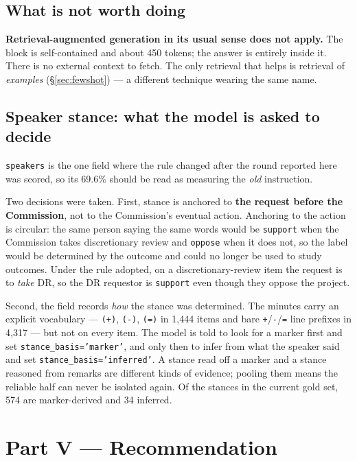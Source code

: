 \documentclass[11pt]{article}
\begin{document}
\subsection{What is not worth doing}

\textbf{Retrieval-augmented generation in its usual sense does not apply.} The block is
self-contained and about 450 tokens; the answer is entirely inside it. There is no external
context to fetch. The only retrieval that helps is retrieval of \emph{examples}
(\S\ref{sec:fewshot}) --- a different technique wearing the same name.

\subsection{Speaker stance: what the model is asked to decide}
\label{sec:stance}

\texttt{speakers} is the one field where the rule changed after the round reported here was
scored, so its 69.6\% should be read as measuring the \emph{old} instruction.

Two decisions were taken. First, stance is anchored to \textbf{the request before the
Commission}, not to the Commission's eventual action. Anchoring to the action is circular: the
same person saying the same words would be \texttt{support} when the Commission takes
discretionary review and \texttt{oppose} when it does not, so the label would be determined by
the outcome and could no longer be used to study outcomes. Under the rule adopted, on a
discretionary-review item the request is to \emph{take} DR, so the DR requestor is
\texttt{support} even though they oppose the project.

Second, the field records \emph{how} the stance was determined. The minutes carry an explicit
vocabulary --- \texttt{(+)}, \texttt{(-)}, \texttt{(=)} in 1{,}444 items and bare
\texttt{+}/\texttt{-}/\texttt{=} line prefixes in 4{,}317 --- but not on every item. The model
is told to look for a marker first and set \texttt{stance\_basis='marker'}, and only then to
infer from what the speaker said and set \texttt{stance\_basis='inferred'}. A stance read off
a marker and a stance reasoned from remarks are different kinds of evidence; pooling them
means the reliable half can never be isolated again. Of the stances in the current gold set,
574 are marker-derived and 34 inferred.

\section{Part V --- Recommendation}
\end{document}
